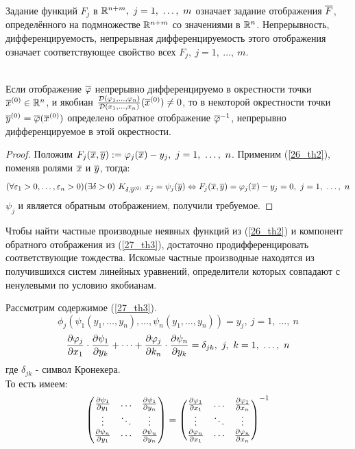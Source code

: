\begin{definition}
	Задание функций $F_j$ в $\mathbb{R}^{n+m},\ j=1,\ \dots,\ m$ означает задание отображения $\overline F$, определённого на подмножестве $\mathbb{R}^{n+m}$ со значениями в $\mathbb{R}^n$. Непрерывность, дифференцируемость, непрерывная дифференцируемость этого отображения означает соответствующее свойство всех $F_j,\ j=1,\ \dots,\ m$.
\end{definition}
\begin{theorem}\label{27_th3}\\
	Если отображение $\overline{\varphi}$ непрерывно дифференцируемо в окрестности точки $\overline x^{({0})}\in\mathbb{R}^n$, и якобиан $\frac{\mathcal D(\varphi_1,\dots,\varphi_n)}{\mathcal D(x_1,\dots,x_n)}(\overline x^{({0})})\ne0$, то в некоторой окрестности точки $\overline y^{({0})}=\overline{\varphi}(\overline x^{({0})})$ определено обратное отображение $\overline{\varphi}^{-1}$, непрерывно дифференцируемое в этой окрестности.
\end{theorem}
\begin{proof}
	Положим $F_j(\overline x,\overline y):=\varphi_j(\overline x)-y_j,\ j=1,\ \dots,\ n$. Применим (\ref{26_th2}), поменяв ролями $\overline x$ и $\overline y$, тогда:
	\[(\fa\eps_1>0,\dots,\eps_n>0)(\ex\delta>0)\ K_{\delta,\v y\n}\ x_j=\psi_j(\v y)\lra F_j(\vx,\v y)=\phi_j(\vx)-y_j=0,\ j=1,\ \dots,\ n\]
	$\psi_j$ и является обратным отображением, получили требуемое.
\end{proof}
\begin{note}
	Чтобы найти частные производные неявных функций из (\ref{26_th2}) и компонент обратного отображения из (\ref{27_th3}), достаточно продифференцировать соответствующие тождества. Искомые частные производные находятся из получившихся систем линейных уравнений, определители которых совпадают с ненулевыми по условию якобианам.
\end{note}
\begin{note}
	Рассмотрим содержимое (\ref{27_th3}).
	\[\phi_j(\psi_1(y_1,\dots,y_n),\dots,\psi_n(y_1,\dots,y_n))=y_j,\ j=1,\ \dots,\ n\]
	\[\frac{\partial \varphi_j}{\partial x_1}\cdot\frac{\partial \psi_1}{\partial y_k}+\dots+\frac{\partial \varphi_j}{\partial k_n}\cdot\frac{\partial \psi_n}{\partial y_k}=\delta_{jk},\ j,\ k=1,\ \dots,\ n\]
	где $\delta_{jk}$ - символ Кронекера.\\
	То есть имеем:
	\begin{equation*}
		\begin{pmatrix}
			\frac{\partial \psi_1}{\partial y_1} & \dots & \frac{\partial \psi_1}{\partial y_n} \\
			\vdots & \ddots & \vdots \\
			\frac{\partial \psi_n}{\partial y_1} & \cdots & \frac{\partial \psi_n}{\partial y_n}
		\end{pmatrix}
		=
		\begin{pmatrix}
			\frac{\partial \varphi_1}{\partial x_1} & \dots & \frac{\partial \varphi_1}{\partial x_n} \\
			\vdots & \ddots & \vdots \\
			\frac{\partial \varphi_n}{\partial x_1} & \cdots & \frac{\partial \varphi_n}{\partial x_n}
		\end{pmatrix}
		^{-1}
	\end{equation*}
\end{note}
